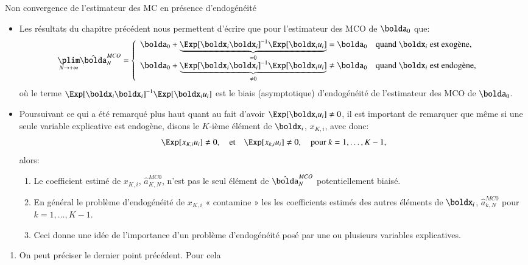 \begin{frame}[allowframebreaks]{Non convergence de l'estimateur des MC en présence d'endogénéité}
\begin{itemize}
     \item Les résultats du chapitre précédent nous permettent d'écrire que 
     pour l'estimateur des MCO de $\bolda_0$ 
     que:
     \begin{align*}
         \underset{N\to +\infty}{\plim}\hat{\bolda}_N^{MCO} &=    \left\{
            \begin{array}{ll}
         \bolda_0 + \underbrace{\Exp[\boldx_i\boldx_i]^{-1}\Exp[\boldx_iu_i]}_{=0} = \bolda_0
         &\text{quand $\boldx_i$ est exogène},\\
         \bolda_0 + \underbrace{\Exp[\boldx_i\boldx_i]^{-1}\Exp[\boldx_iu_i]}_{\neq 0} \neq \bolda_0
&\text{quand $\boldx_i$ est endogène},
        \end{array}
        \right.
     \end{align*}
où le terme $\Exp[\boldx_i\boldx_i]^{-1}\Exp[\boldx_iu_i]$ est le biais (asymptotique) 
d’endogénéité de l'estimateur des MCO de $\bolda_0$.
      \item Poursuivant ce qui a été remarqué plus haut quant au fait d'avoir $\Exp[\boldx_iu_i]\neq 0$, 
      il est important de remarquer que même si une seule variable explicative est
      endogène, disons le $K$-ième élément de $\boldx_i$, $x_{K, i}$, avec donc:
      \[\Exp[x_{K, i}u_i]\neq 0, \quad \text{et} \quad \Exp[x_{k, i}u_i]\neq 0, \quad
      \text{pour $k = 1, \ldots, K-1$}, \]
      alors:
      \begin{enumerate}[$\star$]
        \item Le coefficient estimé de $x_{K, i}$, $\hat{a}^{MC0}_{K, N}$, n'est 
        pas le seul élément de $\hat{\bolda}_N^{MCO}$ potentiellement biaisé.
        \item En général le problème d’endogénéité de $x_{K,i}$ « contamine » les
        les coefficients estimés des autres éléments de $\boldx_i$, $\hat{a}^{MC0}_{k, N}$ 
        pour $k=1, \ldots, K-1$.
        \item Ceci donne une idée de l'importance d'un problème d'endogénéité posé par une 
        ou plusieurs variables explicatives.
      \end{enumerate}
    \end{itemize}
\framebreak 
\begin{remark_fr}
\begin{enumerate}[$\star$]
\item On peut préciser le dernier point précédent. Pour cela

\end{enumerate}
\end{remark_fr}
\end{frame}
